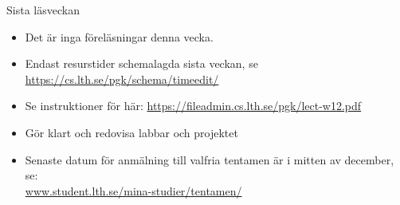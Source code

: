 

\ifkompendium\else


\begin{Slide}{Sista läsveckan}

  \begin{itemize}
    \item Det är inga föreläsningar denna vecka.
    \item Endast resurstider schemalagda sista veckan, se \url{https://cs.lth.se/pgk/schema/timeedit/}
    \item Se instruktioner för  här: \url{https://fileadmin.cs.lth.se/pgk/lect-w12.pdf}
    \item Gör klart och redovisa  labbar och projektet
    \item Senaste datum för anmälning till valfria tentamen är i mitten av december, se: \\\href{https://www.student.lth.se/mina-studier/tentamen/}{www.student.lth.se/mina-studier/tentamen/}
  \end{itemize}

\end{Slide}







